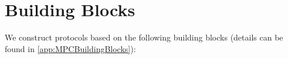 


\section{Building Blocks}
\label{sec:MPCBuildingBlocks}
We construct \smpc protocols based on the following building blocks (details can be found in \autoref{app:MPCBuildingBlocks}):

